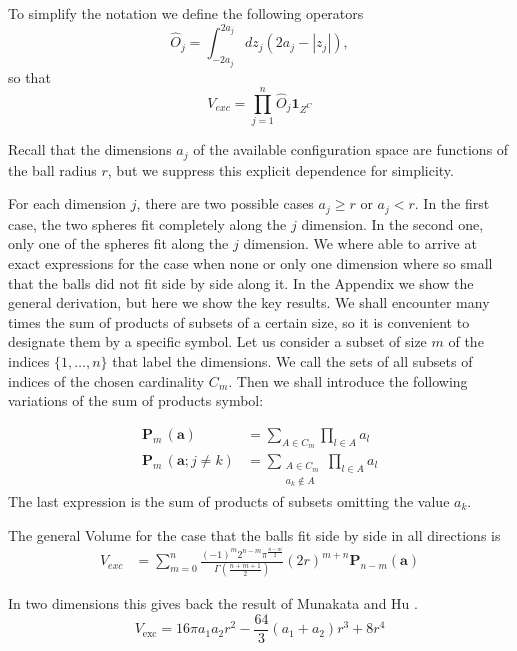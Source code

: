 \documentclass[superscriptaddress,pre,reprint,showpacs,twocolumn]{revtex4-1}
\newcommand{\sumprod}[1]{\mathbf{P}_{#1} \,}
\begin{document}
To simplify the notation we define the following operators
\begin{equation}
\hat{O}_j  = \int_{-2 a_j}^{2 a_j} dz_j \left( 2a_j -|z_j| \right), 
\end{equation}
so that
\begin{equation}\label{voloper}
V_{exc} = \prod_{j=1}^n \hat{O}_j \mathbf{1}_{Z^C}
\end{equation}

Recall that the dimensions $a_j$ of the available configuration space are functions of the ball radius $r$, 
but we suppress this explicit dependence for simplicity.

For each dimension $j$, there are two possible cases $a_j \geq r$ or $a_j < r$. In the first case, the two spheres fit completely along the $j$ dimension. In the second one, only one of the spheres fit along the $j$ dimension. We where able to arrive at
exact expressions for the case when none or only one dimension where so small that
the balls did not fit side by side along it. In the Appendix we
show the general derivation, but here we show the key results.
We shall encounter many times the sum of products of subsets of a certain size,
so it is convenient to designate them by a specific symbol.
Let us consider a subset of size $m$ of the indices $\{1,\ldots, n\}$
that label the dimensions. We call the sets of all subsets of indices
of the chosen cardinality $C_m$. Then we shall introduce the following variations
 of the sum of products symbol:

 \begin{equation}
   \begin{aligned}
   \sumprod{m}(\mathbf{a}) & = \sum_{A \in C _m } \prod_{ l \in A } a_l \\
   \sumprod{m} (\mathbf{a}; j\neq k) & =
   \sum_{\substack{A \in  C _m \\ a_k \notin A} } \prod_{ l \in A } a_l
   \end{aligned}
 \end{equation}
The last expression is the sum of products of subsets omitting the
value $a_k$. 

The general Volume for the case that the balls fit side by side in all directions is
\begin{align}
V_{exc}  & =  \sum_{m=0}^{n}
 \frac{ (-1)^{m} 2^{n-m} \pi^\frac{n-m}{2}}{\Gamma \left( \frac{n+m + 1}{2}\right)} \left(2r\right)^{m+n}
 \mathbf{P}_{n-m}(\mathbf{a})
\end{align}

In two dimensions this gives back the result of Munakata and Hu \cite{Munakata02}.
\begin{equation}
V_\text{exc} = 16 \pi a_1 a_2 r^{2} - \textstyle \frac{64}{3} (a_1+a_2) r^{3}  + 8 r^{4}
\end{equation}
\end{document}
